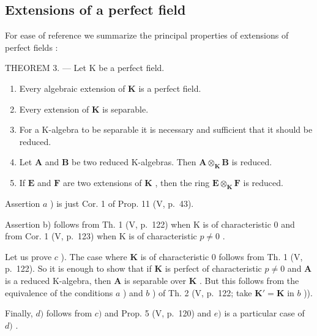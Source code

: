 \subsection{Extensions of a perfect field}

For ease of reference we summarize the principal properties of extensions of perfect fields :

THEOREM 3. --- Let K be a perfect field.

\begin{enumerate}
\def\labelenumi{\alph{enumi})}
\item
  Every algebraic extension of \(\mathbf{K}\) is a perfect field.
\item
  Every extension of \(\mathbf{K}\) is separable.
\item
  For a K-algebra to be separable it is necessary and sufficient that it should be reduced.
\item
  Let \(\mathbf{A}\) and \(\mathbf{B}\) be two reduced K-algebras. Then \(\mathbf{A} \otimes_{\mathbf{K}} \mathbf{B}\) is reduced.
\item
  If \(\mathbf{E}\) and \(\mathbf{F}\) are two extensions of \(\mathbf{K}\) , then the ring \(\mathbf{E} \otimes_{\mathbf{K}} \mathbf{F}\) is reduced.
\end{enumerate}

Assertion \(a\) ) is just Cor. 1 of Prop. 11 (V, p.~43).

Assertion b) follows from Th. 1 (V, p.~122) when K is of characteristic 0 and from Cor. 1 (V, p.~123) when K is of characteristic \(p \neq 0\) .

Let us prove \(c\) ). The case where \(\mathbf{K}\) is of characteristic 0 follows from Th. 1 (V, p.~122). So it is enough to show that if \(\mathbf{K}\) is perfect of characteristic \(p \neq 0\) and \(\mathbf{A}\) is a reduced K-algebra, then \(\mathbf{A}\) is separable over \(\mathbf{K}\) . But this follows from the equivalence of the conditions \(a\) ) and \(b\) ) of Th. 2 (V, p.~122; take \(\mathbf{K}' = \mathbf{K}\) in \(b\) )).

Finally, \(d)\) follows from \(c)\) and Prop. 5 (V, p.~120) and \(e)\) is a particular case of \(d)\) .


